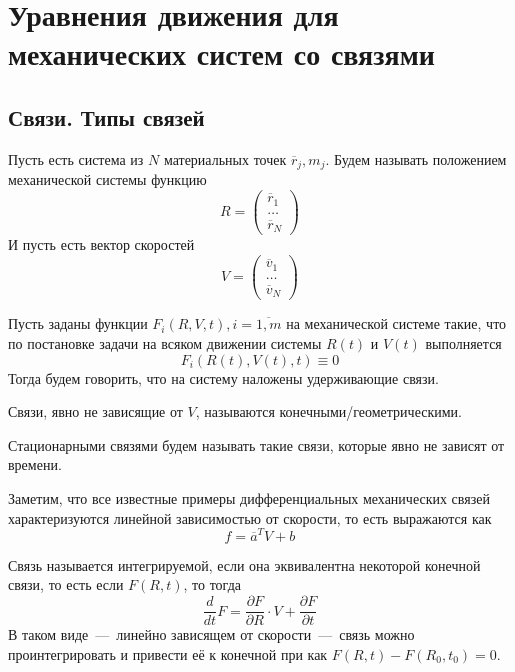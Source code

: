 \section{Уравнения движения для механических систем со связями}
\subsection{Связи. Типы связей}
Пусть есть система из $N$ материальных точек $\overline{r}_j, m_j$. Будем называть положением механической системы функцию \[R = \begin{pmatrix}
        \overline{r}_1 \\ \ldots \\ \overline{r}_N
    \end{pmatrix}\]
    И пусть есть вектор скоростей \[ V = \begin{pmatrix}
        \overline{v}_1 \\ \ldots \\ \overline{v}_N
    \end{pmatrix}\]
\begin{definition}
    Пусть заданы функции $F_i(R, V, t), i = \overline{1, m}$ на механической системе такие, что по постановке задачи на всяком движении системы $R(t)$ и $V(t)$ выполняется \[F_i(R(t), V(t), t) \equiv 0\]
    Тогда будем говорить, что на систему наложены удерживающие связи.
\end{definition}
\begin{definition}
    Связи, явно не зависящие от $V$, называются конечными/геометрическими.
\end{definition}
\begin{definition}
    Стационарными связями будем называть такие связи, которые явно не зависят от времени.
\end{definition}
\begin{note}
    Заметим, что все известные примеры дифференциальных механических связей характеризуются линейной зависимостью от скорости, то есть выражаются как \[f = \overline{a}^TV + b\]
\end{note}
\begin{definition}
    Связь называется интегрируемой, если она эквивалентна некоторой конечной связи, то есть если $F(R, t)$, то тогда \[\dfrac{d}{dt}F =  \dfrac{\partial F}{\partial R}\cdot V + \dfrac{\partial F}{\partial t}\]
    В таком виде~---~линейно зависящем от скорости~---~связь можно проинтегрировать и привести её к конечной при  как $F(R, t) - F(R_0, t_0) = 0$.
\end{definition}
